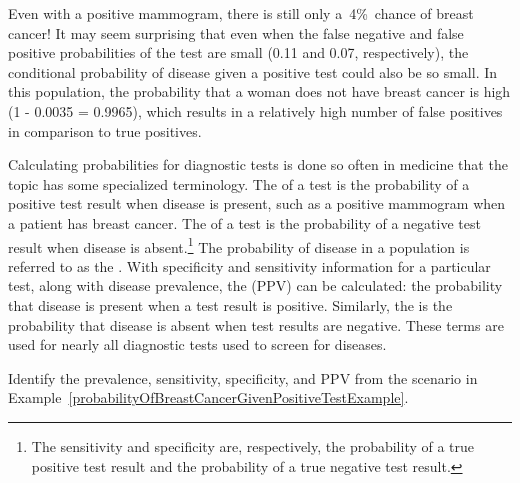 Even with a positive mammogram, there is still only a~4\%~chance of breast cancer! It may seem surprising that even when the false negative and false positive probabilities of the test are small (0.11 and 0.07, respectively), the conditional probability of disease given a positive test could also be so small. In this population, the probability that a woman does not have breast cancer is high (1 - 0.0035 = 0.9965), which results in a relatively high number of false positives in comparison to true positives.

Calculating probabilities for diagnostic tests is done so often in medicine that the topic has some specialized terminology. The  of a test is the probability of a positive test result when disease is present, such as a positive mammogram when a patient has breast cancer. The  of a test is the probability of a negative test result when disease is absent.\footnote{The sensitivity and specificity are, respectively, the probability of a true positive test result and the probability of a true negative test result.} The probability of disease in a population is referred to as the . With specificity and sensitivity information for a particular test, along with disease prevalence, the  (PPV) can be calculated: the probability that disease is present when a test result is positive. Similarly, the  is the probability that disease is absent when test results are negative. These terms are used for nearly all diagnostic tests used to screen for diseases.

\begin{exercisewrap}
\begin{nexercise}
	Identify the prevalence, sensitivity, specificity, and PPV from the scenario in Example~\ref{probabilityOfBreastCancerGivenPositiveTestExample}.\footnotemark{}
\end{nexercise}
\end{exercisewrap}


\textD{\newpage}


